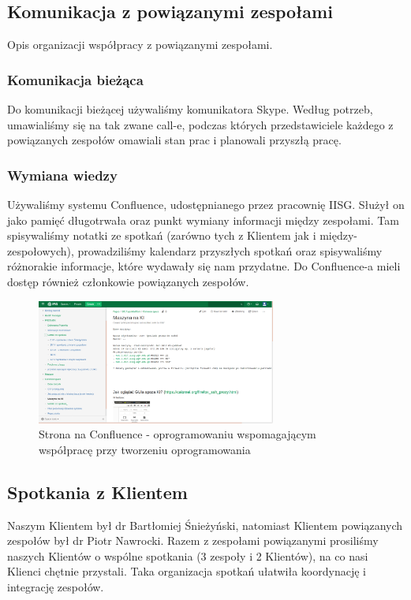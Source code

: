 \documentclass[polish,12pt]{aghthesis}
\begin{document}
\subsection{Komunikacja z powiązanymi zespołami}
Opis organizacji współpracy z powiązanymi zespołami.
\subsubsection{Komunikacja bieżąca}
Do komunikacji bieżącej używaliśmy komunikatora Skype. Według potrzeb, umawialiśmy się na tak zwane call-e, podczas których przedstawiciele każdego z powiązanych zespołów omawiali stan prac i planowali przyszłą pracę.
\subsubsection{Wymiana wiedzy}
Używaliśmy systemu Confluence, udostępnianego przez pracownię IISG. Służył on jako pamięć długotrwała oraz punkt wymiany informacji między zespołami. Tam spisywaliśmy notatki ze spotkań (zarówno tych z Klientem jak i między-zespołowych), prowadziliśmy kalendarz przyszłych spotkań oraz spisywaliśmy różnorakie informacje, które wydawały się nam przydatne. Do Confluence-a mieli dostęp również członkowie powiązanych zespołów.
 \begin{figure}[H]
    \includegraphics[width=0.7\textwidth]{confluence-maszyna}
    \caption{Strona na Confluence - oprogramowaniu wspomagającym współpracę przy tworzeniu oprogramowania}
    \end{figure}
    
\subsection{Spotkania z Klientem}
Naszym Klientem był dr Bartłomiej Śnieżyński, natomiast Klientem powiązanych zespołów był dr Piotr Nawrocki. Razem z zespołami powiązanymi prosiliśmy naszych Klientów o wspólne spotkania (3 zespoły i 2 Klientów), na co nasi Klienci chętnie przystali. Taka organizacja spotkań ułatwiła koordynację i integrację zespołów.
  
\end{document}

